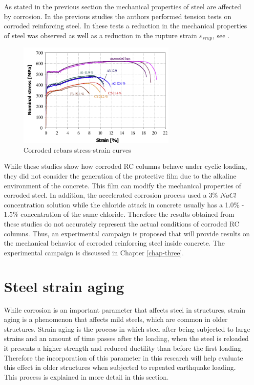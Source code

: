 As stated in the previous section the mechanical properties of steel are affected by corrosion. In the previous studies \cite{Meda2014} the authors performed tension tests on corroded reinforcing steel. In these tests a reduction in the mechanical properties of steel was observed as well as a reduction in the rupture strain $\varepsilon_{srup}$, see . 

\begin{figure}[htbp]
	\centering
	\includegraphics[width=0.7\textwidth]{Chapter-3/figs/Meda_StressStrain}
	\caption{Corroded rebars stress-strain curves \cite{Meda2014}}
	\label{fig:Meda_RebarTest}
\end{figure}

While these studies show how corroded RC columns behave under cyclic loading, they did not consider the generation of the protective film due to the alkaline environment of the concrete. This film can modify the mechanical properties of corroded steel. In addition, the accelerated corrosion process used a 3\% $NaCl$ concentration solution while the chloride attack in concrete usually has a 1.0\% - 1.5\% concentration of the same chloride. Therefore the results obtained from these studies do not accurately represent the actual conditions of corroded RC columns. Thus, an experimental campaign is proposed that will provide results on the mechanical behavior of corroded reinforcing steel inside concrete. The experimental campaign is discussed in Chapter \ref{chap-three}.

\section{Steel strain aging}

While corrosion is an important parameter that affects steel in structures, strain aging is a phenomenon that affects mild steels, which are common in older structures. Strain aging is the process in which steel after being subjected to large strains and an amount of time passes after the loading, when the steel is reloaded it presents a higher strength and reduced ductility than before the first loading. Therefore the incorporation of this parameter in this research will help evaluate this effect in older structures when subjected to repeated earthquake loading. This process is explained in more detail in this section.

